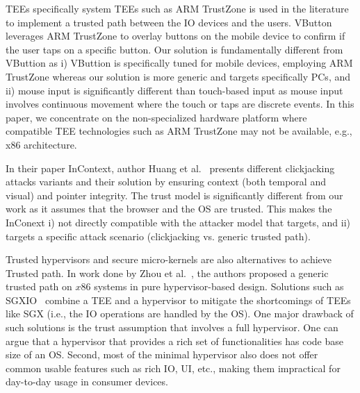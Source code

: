   TEEs specifically system TEEs such as ARM TrustZone is used in the literature to implement a trusted path between the IO devices and the users. %
VButton~\cite{li2018vbutton} leverages ARM TrustZone to overlay buttons on the mobile device to confirm if the user taps on a specific button. Our solution is fundamentally different from VButtion as i) VButtion is specifically tuned for mobile devices, employing ARM TrustZone whereas our solution is more generic and targets specifically PCs, and ii) mouse input is significantly different than touch-based input as mouse input involves continuous movement where the touch or taps are discrete events. In this paper, we concentrate on the non-specialized hardware platform where compatible TEE technologies such as ARM TrustZone may not be available, e.g., x86 architecture. 

 In their paper InContext, author Huang et al.~\cite{huang2012clickjacking} presents different clickjacking attacks variants and their solution by ensuring context (both temporal and visual) and pointer integrity. The trust model is significantly different from our work as it assumes that the browser and the OS are trusted. This makes the InConext i) not directly compatible with the attacker model that \name targets, and ii) targets a specific attack scenario (clickjacking vs. generic trusted path).


 Trusted hypervisors and secure micro-kernels are also alternatives to achieve Trusted path. In work done by Zhou et al.~\cite{zhou2012building}, the authors proposed a generic trusted path on $x86$ systems in pure hypervisor-based design. Solutions such as SGXIO~\cite{weiser2017sgxio}  combine a TEE and a hypervisor to mitigate the shortcomings of TEEs like SGX (i.e., the IO operations are handled by the OS). One major drawback of such solutions is the trust assumption that involves a full hypervisor. One can argue that a hypervisor that provides a rich set of functionalities has code base size of an OS. Second, most of the minimal hypervisor also does not offer common usable features such as rich IO, UI, etc., making them impractical for day-to-day usage in consumer devices. %


